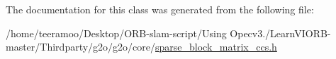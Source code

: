The documentation for this class was generated from the following file\+:\begin{DoxyCompactItemize}
\item 
/home/teeramoo/\+Desktop/\+O\+R\+B-\/slam-\/script/\+Using Opecv3./\+Learn\+V\+I\+O\+R\+B-\/master/\+Thirdparty/g2o/g2o/core/\hyperlink{sparse__block__matrix__ccs_8h}{sparse\+\_\+block\+\_\+matrix\+\_\+ccs.\+h}\end{DoxyCompactItemize}
